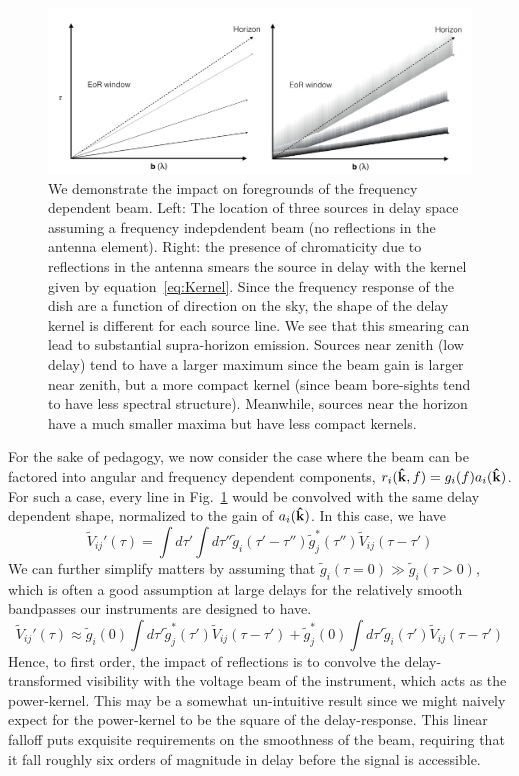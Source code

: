 \documentclass[twocolumn]{emulateapj}
\begin{document}
\begin{figure}[h!]
\includegraphics[width=\textwidth]{figures/wedgeCompare.pdf}
\caption{We demonstrate the impact on foregrounds of the frequency dependent beam. Left: The location of three sources in delay space assuming a frequency indepdendent beam (no reflections in the antenna element). Right: the presence of chromaticity due to reflections in the antenna smears the source in delay with the kernel given by equation~\ref{eq:Kernel}. Since the frequency response of the dish are a function of direction on the sky, the shape of the delay kernel is different for each source line. We see that this smearing can lead to substantial supra-horizon emission. Sources near zenith (low delay) tend to have a larger maximum since the beam gain is larger near zenith, but a more compact kernel (since beam bore-sights tend to have less spectral structure). Meanwhile, sources near the horizon have a much smaller maxima but have less compact kernels.}
\label{fig:Smearing}
\end{figure}
For the sake of pedagogy, we now consider the case where the beam can be factored into angular and frequency dependent components, $r_i({\bf \hat{k}},f) = g_i(f)a_i({\bf \hat{k}})$. For such a case, every line in Fig.~\ref{fig:Smearing} would be convolved with the same delay dependent shape, normalized to the gain of $a_i({\bf \hat{k}})$. In this case, we have
\begin{equation}
\widetilde{V}_{ij}'(\tau) = \int d\tau' \int d \tau'' \widetilde{g}_i(\tau' - \tau'')\widetilde{g}^*_j(\tau'') \widetilde{V}_{ij}(\tau-\tau')
\end{equation}
We can further simplify matters by assuming that $\widetilde{g}_i(\tau=0)\gg\widetilde{g}_i(\tau>0)$, which is often a good assumption at large delays for the relatively smooth bandpasses our instruments are designed to have. 
\begin{equation}\label{eq:KernelApprox}
\widetilde{V}_{ij}'(\tau) \approx \widetilde{g}_i(0)\int d \tau' \widetilde{g}_j^*(\tau')\widetilde{V}_{ij}(\tau- \tau') + \widetilde{g}_j^*(0) \int d \tau' \widetilde{g}_i(\tau')\widetilde{V}_{ij}(\tau-\tau') 
\end{equation}
Hence, to first order, the impact of reflections is to convolve the delay-transformed visibility with the voltage beam of the instrument, which acts as the power-kernel. This may be a somewhat un-intuitive result since we might naively expect for the power-kernel to be the square of the delay-response. This linear falloff puts exquisite requirements on the smoothness of the beam, requiring that it fall roughly six orders of magnitude in delay before the signal is accessible. 
\end{document}
